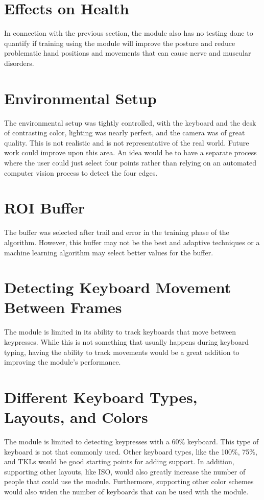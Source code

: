 \documentclass{report}
\begin{document}
\section{Effects on Health}
In connection with the previous section, the module also has no testing done to
quantify if training using the module will improve the posture and reduce
problematic hand positions and movements that can cause nerve and muscular
disorders.

\section{Environmental Setup}
The environmental setup was tightly controlled, with the keyboard and the desk
of contrasting color, lighting was nearly perfect, and the camera was of great
quality. This is not realistic and is not representative of the real world.
Future work could improve upon this area. An idea would be to have a separate
process where the user could just select four points rather than relying on an
automated computer vision process to detect the four edges.

\section{ROI Buffer}
The buffer was selected after trail and error in the training phase of the
algorithm. However, this buffer may not be the best and adaptive techniques or a
machine learning algorithm may select better values for the buffer.

\section{Detecting Keyboard Movement Between Frames}
The module is limited in its ability to track keyboards that move between
keypresses. While this is not something that usually happens during keyboard
typing, having the ability to track movements would be a great addition to
improving the module's performance.

\section{Different Keyboard Types, Layouts, and Colors}
The module is limited to detecting keypresses with a 60\% keyboard. This type of
keyboard is not that commonly used. Other keyboard types, like the 100\%, 75\%,
and TKLs would be good starting points for adding support. In addition,
supporting other layouts, like ISO, would also greatly increase the number of
people that could use the module. Furthermore, supporting other color schemes
would also widen the number of keyboards that can be used with the module.
\end{document}

